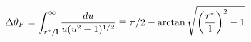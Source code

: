 \begin{equation}
\label{e.thetaf}
\Delta \theta_F=
\int_{r^*/{\bf l}}^{\infty}\frac{du}{u(u^2-1)^{1/2}}\equiv \pi/2-\arctan 
\sqrt{\left(\frac {r^*}{\bf l}\right)^2-1}
\end{equation}


